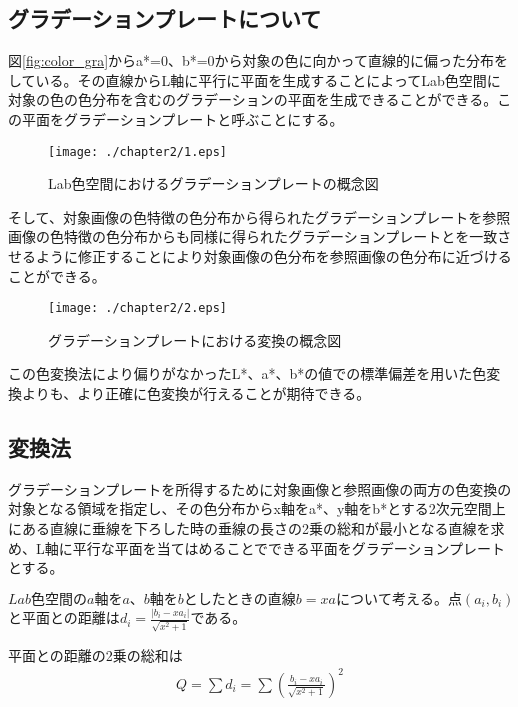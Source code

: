 \subsection{グラデーションプレートについて}
図\ref{fig:color_gra}からa*=0、b*=0から対象の色に向かって直線的に偏った分布をしている。その直線からL軸に平行に平面を生成することによってLab色空間に対象の色の色分布を含むのグラデーションの平面を生成できることができる。この平面をグラデーションプレートと呼ぶことにする。\par
\begin{figure}[htbp]
  \begin{center}
    \texttt{[image: ./chapter2/1.eps]}
    \caption{Lab色空間におけるグラデーションプレートの概念図}
    \label{fig:lab_gainen}
  \end{center}
\end{figure}

そして、対象画像の色特徴の色分布から得られたグラデーションプレートを参照画像の色特徴の色分布からも同様に得られたグラデーションプレートとを一致させるように修正することにより対象画像の色分布を参照画像の色分布に近づけることができる。\par
\newpage
\begin{figure}[htbp]
  \begin{center}
    \texttt{[image: ./chapter2/2.eps]}
    \caption{グラデーションプレートにおける変換の概念図}
    \label{fig:lab_gainen}
  \end{center}
\end{figure}

この色変換法により偏りがなかったL*、a*、b*の値での標準偏差を用いた色変換よりも、より正確に色変換が行えることが期待できる。\par
\subsection{変換法}
グラデーションプレートを所得するために対象画像と参照画像の両方の色変換の対象となる領域を指定し、その色分布からx軸をa*、y軸をb*とする2次元空間上にある直線に垂線を下ろした時の垂線の長さの2乗の総和が最小となる直線を求め、L軸に平行な平面を当てはめることでできる平面をグラデーションプレートとする。\par
$Lab色空間のa軸をa、b軸をbとしたときの直線b=xaについて考える。点(a_i,b_i)$と平面との距離は$d_i=\frac{|b_i-xa_i|}{\sqrt{x^2+1}}$である。\par
平面との距離の2乗の総和は
\begin{eqnarray}
  Q = \sum d_i = \sum (\frac{b_i-xa_i}{\sqrt{x^2+1}})^2
\end{eqnarray}

